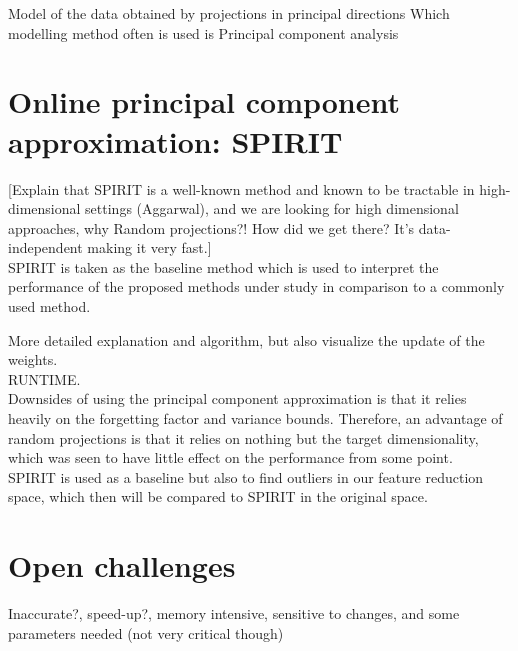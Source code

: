 Model of the data obtained by projections in principal directions
Which modelling method often is used is Principal component analysis






\section{Online principal component approximation: SPIRIT}
\label{sec:methods_baseline}

[Explain that SPIRIT is a well-known method and known to be tractable in high-dimensional settings (Aggarwal), and we are looking for high dimensional approaches, why Random projections?! How did we get there? It's data-independent making it very fast.]\\

SPIRIT is taken as the baseline method which is used to interpret the performance of the proposed methods under study in comparison to a commonly used method.

More detailed explanation and algorithm, but also visualize the update of the weights.\\

RUNTIME.\\

Downsides of using the principal component approximation is that it relies heavily on the forgetting factor and variance bounds. 
Therefore, an advantage of random projections is that it relies on nothing but the target dimensionality, which was seen to have little effect on the performance from some point.\\

SPIRIT is used as a baseline but also to find outliers in our feature reduction space, which then will be compared to SPIRIT in the original space.\\




\section{Open challenges}
Inaccurate?, speed-up?, memory intensive, sensitive to changes, and some parameters needed (not very critical though)
